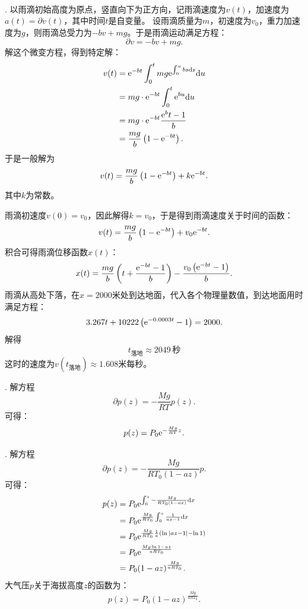 \documentclass[12pt,UTF8]{ctexbook}
\begin{document}
\begin{so}
    \mbox{} \\
    . 以雨滴初始高度为原点，竖直向下为正方向，记雨滴速度为$v(t)$，加速度为$a(t) = \partial v (t)$，其中时间$t$是自变量。
    设雨滴质量为$m$，初速度为$v_0$，重力加速度为$g$，则雨滴总受力为$- bv + mg$。于是雨滴运动满足方程：
    $$ \partial v = - bv + mg.$$
    解这个微变方程，得到特定解：
    \begin{align*}
        v(t) &= \mathrm{e}^{-bt} \int_0^t mg \mathrm{e}^{\int_0^u bs\mathrm{d}s} \mathrm{d}u\\
        &= mg \cdot \mathrm{e}^{-bt} \int_0^t \mathrm{e}^{bu}\mathrm{d}u \\
        &= mg \cdot \mathrm{e}^{-bt} \frac{\mathrm{e}^bt - 1}{b} \\
        &= \frac{mg}{b}\left(1 - \mathrm{e}^{-bt}\right).
    \end{align*}
    于是一般解为
    $$ v(t) = \frac{mg}{b}\left(1 - \mathrm{e}^{-bt}\right) + k\mathrm{e}^{-bt}. $$
    其中$k$为常数。
    
    雨滴初速度$v(0) = v_0$，因此解得$k = v_0$，于是得到雨滴速度关于时间的函数：
    $$ v(t) = \frac{mg}{b}\left(1 - \mathrm{e}^{-bt}\right) + v_0\mathrm{e}^{-bt}. $$
    积合可得雨滴位移函数$x(t)$：
    $$ x(t) = \frac{mg}{b}\left(t + \frac{\mathrm{e}^{-bt} - 1}{b}\right) - \frac{v_0\left(\mathrm{e}^{-bt} - 1\right)}{b}. $$
    雨滴从高处下落，在$x=2000$米处到达地面，代入各个物理量数值，到达地面用时满足方程：
    $$ 3.267t + 10222 \left(\mathrm{e}^{-0.0003t} - 1\right) = 2000.  $$
    解得
    $$ t_{\text{落地}} \approx 2049\,\mbox{秒} $$
    这时的速度为$v(t_{\text{落地}}) \approx 1.608$米每秒。

    . 解方程
    $$ \partial p(z) = -\frac{Mg}{RT} p(z). $$
    可得：
    $$ p(z) = P_0\mathrm{e}^{-\frac{Mg}{RT}z}.$$

    . 解方程
    $$ \partial p(z) = -\frac{Mg}{RT_0(1 - az)} p. $$
    可得：
    \begin{align*}
        p(z) &= P_0\mathrm{e}^{\int_0^z -\frac{Mg}{RT_0(1 - ax)}\mathrm{d}x} \\
        &= P_0\mathrm{e}^{\frac{Mg}{RT_0}\int_0^z \frac{1}{ax - 1}\mathrm{d}x} \\
        &= P_0\mathrm{e}^{\frac{Mg}{RT_0}\frac{1}{a}\left(\ln{|az - 1|} - \ln{1}\right)} \\
        &= P_0\mathrm{e}^{\frac{Mg\ln{1 - az}}{aRT_0}} \\
        &= P_0 (1 - az)^{\frac{Mg}{aRT_0}}.
    \end{align*}
    大气压$p$关于海拔高度$z$的函数为：
    $$ p(z) = P_0 (1 - az)^{\frac{Mg}{aRT_0}}.$$


\end{so}
\end{document}
